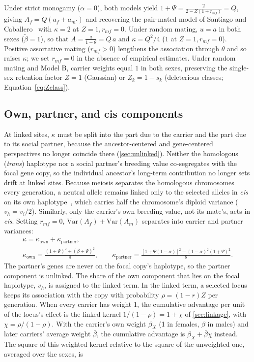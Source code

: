 \documentclass{article}
\begin{document}
Under strict monogamy ($\alpha = 0$), both models yield $1 + \Psi = \frac{2}{2 - Z(1 + r_{mf})} = Q$, giving $A_f = Q(a_f + a_{m'})$ and recovering the pair-mated model of Santiago and Caballero~\cite{santiago1995} with $\kappa = 2$ at $Z = 1, r_{mf} = 0$. Under random mating, $u = a$ in both sexes ($\tilde{\beta} = 1$), so that $A = \frac{a}{1-\theta} = Q\,a$ and $\kappa = Q^2/4$ ($1$ at $Z = 1, r_{mf} = 0$). Positive assortative mating ($r_{mf} > 0$) lengthens the association through $\theta$ and so raises $\kappa$; we set $r_{mf} = 0$ in the absence of empirical estimates. Under random mating and Model B, carrier weights equal $1$ in both sexes, preserving the single-sex retention factor $Z = 1$ (Gaussian) or $Z_k = 1 - s_k$ (deleterious classes; Equation~\eqref{eq:Zclass}).

\subsection{Own, partner, and cis components}\label{app:C_split}
At linked sites, $\kappa$ must be split into the part due to the carrier and the part due to its social partner, because the ancestor-centered and gene-centered perspectives no longer coincide there (\autoref{sec:unlinked}). Neither the homologous (\emph{trans}) haplotype nor a social partner's breeding value co-segregates with the focal gene copy, so the individual ancestor's long-term contribution no longer sets drift at linked sites. Because meiosis separates the homologous chromosomes every generation, a neutral allele remains linked only to the selected alleles in \emph{cis} on its own haplotype~\cite{buffaloKern2024}, which carries half the chromosome's diploid variance ($v_h = v_i/2$). Similarly, only the carrier's own breeding value, not its mate's, acts in \emph{cis}. Setting $r_{mf} = 0$, $\mathrm{Var}(A_f) + \mathrm{Var}(A_m)$ separates into carrier and partner variances:
\begin{equation}
\begin{gathered}
    \kappa = \kappa_\text{own} + \kappa_\text{partner}, \\
    \kappa_\text{own} = \frac{(1+\Psi)^2 + (\beta+\Psi)^2}{8}, \qquad
    \kappa_\text{partner} = \frac{\left[1+\Psi(1-\alpha)\right]^2 + (1-\alpha)^2(1+\Psi)^2}{8}.
\end{gathered}
\label{eq:kappa_split}
\end{equation}
The partner's genes are never on the focal copy's haplotype, so the partner component is unlinked. The share of the own component that lies on the focal haplotype, $v_h$, is assigned to the linked term. In the linked term, a selected locus keeps its association with the copy with probability $\rho = (1-r)Z$ per generation. When every carrier has weight 1, the cumulative advantage per unit of the locus's effect is the linked kernel $1/(1-\rho) = 1 + \chi$ of \autoref{sec:linkage}, with $\chi = \rho/(1-\rho)$. With the carrier's own weight $\beta_X$ (1 in females, $\beta$ in males) and later carriers' average weight $\bar{\beta}$, the cumulative advantage is $\beta_X + \bar{\beta}\chi$ instead. The square of this weighted kernel relative to the square of the unweighted one, averaged over the sexes, is
\end{document}
